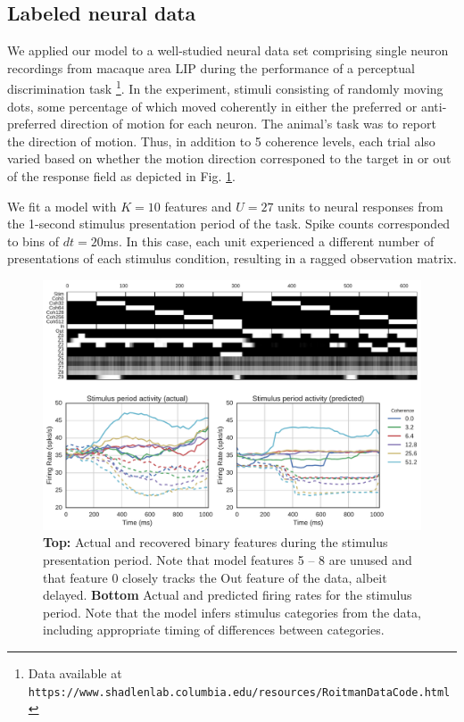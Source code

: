 \documentclass{article} %
\begin{document}
\subsection{Labeled neural data}
We applied our model to a well-studied neural data set comprising single neuron recordings from macaque area LIP during the performance of a perceptual discrimination task \cite{roitman2002response}\footnote{Data available at \texttt{https://www.shadlenlab.columbia.edu/resources/RoitmanDataCode.html}}. In the experiment, stimuli consisting of randomly moving dots, some percentage of which moved coherently in either the preferred or anti-preferred direction of motion for each neuron. The animal's task was to report the direction of motion. Thus, in addition to 5 coherence levels, each trial also varied based on whether the motion direction corresponed to the target in or out of the response field as depicted in Fig. \ref{roitman}.

We fit a model with $K = 10$ features and $U = 27$ units to neural responses from the 1-second stimulus presentation period of the task. Spike counts corresponded to bins of $dt = 20$ms. In this case, each unit experienced a different number of presentations of each stimulus condition, resulting in a ragged observation matrix.

\begin{figure}[ht]
    \center
    \includegraphics[width=0.7\linewidth]{figures/roitman}
    \caption{\textbf{Top:} Actual and recovered binary features during the stimulus presentation period. Note that model features 5 -- 8 are unused and that feature 0 closely tracks the Out feature of the data, albeit delayed. \textbf{Bottom} Actual and predicted firing rates for the stimulus period. Note that the model infers stimulus categories from the data, including appropriate timing of differences between categories.}
    \label{roitman}
\end{figure}
\end{document}
